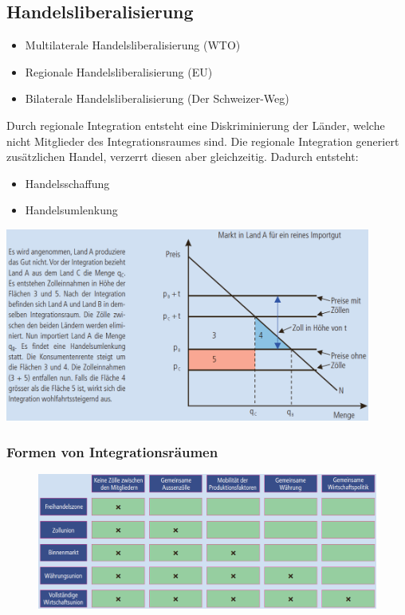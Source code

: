 \subsection{Handelsliberalisierung}
\begin{minipage}{7cm}
	\begin{itemize}
		\item Multilaterale Handelsliberalisierung (WTO)
		\item Regionale Handelsliberalisierung (EU)
		\item Bilaterale Handelsliberalisierung (Der Schweizer-Weg)
	\end{itemize}
	Durch regionale Integration entsteht eine Diskriminierung der Länder, welche nicht Mitglieder des Integrationsraumes sind. Die regionale Integration generiert zusätzlichen Handel, verzerrt diesen aber gleichzeitig. Dadurch entsteht: 
	\begin{itemize}
		\item Handelsschaffung
		\item Handelsumlenkung
	\end{itemize}
\end{minipage}
\begin{minipage}{12cm}
	\includegraphics[width=12cm]{images/integrationsraume.png}
\end{minipage}
\subsubsection{Formen von Integrationsräumen}
\begin{figure}[h]
	\centering
	\includegraphics[width=0.75\linewidth]{images/integrationsformen.png}
\end{figure}